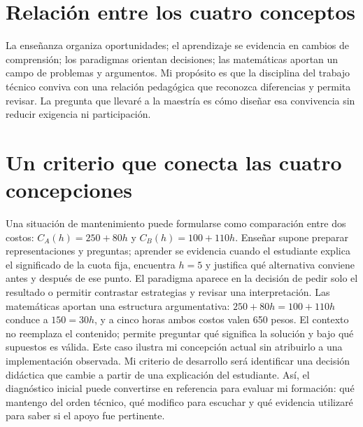 \documentclass[spanish,letterpaper,oneside]{article}
\begin{document}
\section{Relación entre los cuatro conceptos}
La enseñanza organiza oportunidades; el aprendizaje se evidencia en cambios de comprensión; los paradigmas orientan decisiones; las matemáticas aportan un campo de problemas y argumentos. Mi propósito es que la disciplina del trabajo técnico conviva con una relación pedagógica que reconozca diferencias y permita revisar. La pregunta que llevaré a la maestría es cómo diseñar esa convivencia sin reducir exigencia ni participación.

\section{Un criterio que conecta las cuatro concepciones}
Una situación de mantenimiento puede formularse como comparación entre dos costos: $C_A(h)=250+80h$ y $C_B(h)=100+110h$. Enseñar supone preparar representaciones y preguntas; aprender se evidencia cuando el estudiante explica el significado de la cuota fija, encuentra $h=5$ y justifica qué alternativa conviene antes y después de ese punto. El paradigma aparece en la decisión de pedir solo el resultado o permitir contrastar estrategias y revisar una interpretación.
Las matemáticas aportan una estructura argumentativa: $250+80h=100+110h$ conduce a $150=30h$, y a cinco horas ambos costos valen 650 pesos. El contexto no reemplaza el contenido; permite preguntar qué significa la solución y bajo qué supuestos es válida. Este caso ilustra mi concepción actual sin atribuirlo a una implementación observada.
Mi criterio de desarrollo será identificar una decisión didáctica que cambie a partir de una explicación del estudiante. Así, el diagnóstico inicial puede convertirse en referencia para evaluar mi formación: qué mantengo del orden técnico, qué modifico para escuchar y qué evidencia utilizaré para saber si el apoyo fue pertinente.
\end{document}
